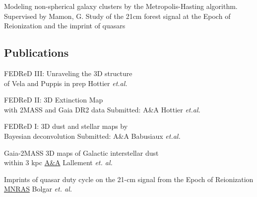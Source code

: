 \documentclass[
 a4paper, 9.5pt,
  sidebarwidth=0.3\paperwidth,
]{fortysecondscv}
\begin{document}
\makefrontsidebar

\begin{cvtable}
  {Modeling non-spherical galaxy clusters by the Metropolis-Hasting algorithm. Supervised by
  Mamon, G.}
  {Study of the 21cm forest signal at the Epoch of Reionization and the imprint of quasars}
\end{cvtable}


\begin{cvtable}
\end{cvtable}

\subsection{Publications}
\begin{cvtable}
  {FEDReD III: Unraveling the 3D structure \\of Vela and Puppis}
  {in prep}
  {Hottier \textit{et.al.}}

  {FEDReD II: 3D Extinction Map\\ with 2MASS and Gaia DR2 data}
  {Submitted: A\&A}
  {Hottier \textit{et.al.}}

  {FEDReD I: 3D dust and stellar maps by \\Bayesian deconvolution}
  {Submitted: A\&A}
  {Babusiaux \textit{et.al.}}

  {Gaia-2MASS 3D maps of Galactic interstellar dust\\within 3 kpc}
  {\href{https://ui.adsabs.harvard.edu/\#abs/2019arXiv190204116L/abstract}{A\&A}}
  {Lallement \textit{et. al.}}

  {Imprints of quasar duty cycle on the 21-cm signal from the Epoch of Reionization}
  {\href{https://ui.adsabs.harvard.edu/\#abs/2019arXiv190204116L/abstract}{MNRAS}}
  {Bolgar \textit{et. al.}}
\end{cvtable}
\end{document}
